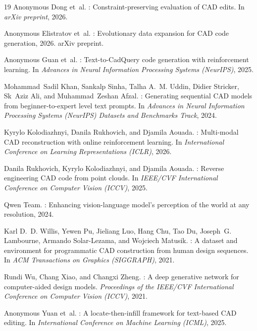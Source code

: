 \documentclass{article}
\begin{document}
\begin{thebibliography}{19}
Anonymous Dong et~al.
: Constraint-preserving evaluation of {CAD} edits.
\newblock In \emph{arXiv preprint}, 2026.

Anonymous Elistratov et~al.
: Evolutionary data expansion for {CAD} code generation,
  2026.
\newblock arXiv preprint.

Anonymous Guan et~al.
: Text-to-{CadQuery} code generation with reinforcement
  learning.
\newblock In \emph{Advances in Neural Information Processing Systems
  (NeurIPS)}, 2025.

Mohammad~Sadil Khan, Sankalp Sinha, Talha A.~M. Uddin, Didier Stricker, Sk~Aziz
  Ali, and Muhammad~Zeshan Afzal.
: Generating sequential {CAD} models from
  beginner-to-expert level text prompts.
\newblock In \emph{Advances in Neural Information Processing Systems (NeurIPS)
  Datasets and Benchmarks Track}, 2024.

Kyrylo Kolodiazhnyi, Danila Rukhovich, and Djamila Aouada.
: Multi-modal {CAD} reconstruction with online
  reinforcement learning.
\newblock In \emph{International Conference on Learning Representations
  (ICLR)}, 2026.

Danila Rukhovich, Kyrylo Kolodiazhnyi, and Djamila Aouada.
: Reverse engineering {CAD} code from point clouds.
\newblock In \emph{IEEE/CVF International Conference on Computer Vision
  (ICCV)}, 2025.

Qwen Team.
: Enhancing vision-language model's perception of the world
  at any resolution, 2024.

Karl D.~D. Willis, Yewen Pu, Jieliang Luo, Hang Chu, Tao Du, Joseph~G.
  Lambourne, Armando Solar-Lezama, and Wojciech Matusik.
: A dataset and environment for programmatic
  {CAD} construction from human design sequences.
\newblock In \emph{ACM Transactions on Graphics (SIGGRAPH)}, 2021.

Rundi Wu, Chang Xiao, and Changxi Zheng.
: A deep generative network for computer-aided design
  models.
\newblock \emph{Proceedings of the IEEE/CVF International Conference on
  Computer Vision (ICCV)}, 2021.

Anonymous Yuan et~al.
: A locate-then-infill framework for text-based {CAD}
  editing.
\newblock In \emph{International Conference on Machine Learning (ICML)}, 2025.

\end{thebibliography}
\end{document}
